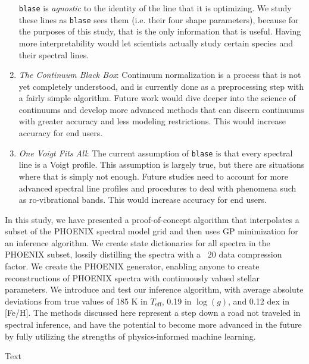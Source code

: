 \documentclass[twocolumn]{aastex631}
\begin{document}
\begin{enumerate}[label=-]
    \texttt{blase} is \textit{agnostic} to the identity of the line that it is optimizing. 
    We study these lines as \texttt{blase} sees them (i.e. their four shape parameters), because for the purposes of this study, that is the only information that is useful.
    Having more interpretability would let scientists actually study certain species and their spectral lines.
    \item \textit{The Continuum Black Box}: Continuum normalization is a process that is not yet completely understood, and is currently done as a preprocessing step with a fairly simple algorithm. 
    Future work would dive deeper into the science of continuums and develop more advanced methods that can discern continuums with greater accuracy and less modeling restrictions.
    This would increase accuracy for end users.
    \item \textit{One Voigt Fits All}: The current assumption of \texttt{blase} is that every spectral line is a Voigt profile. 
    This assumption is largely true, but there are situations where that is simply not enough. 
    Future studies need to account for more advanced spectral line profiles and procedures to deal with phenomena such as ro-vibrational bands.
    This would increase accuracy for end users.
\end{enumerate}
In this study, we have presented a proof-of-concept algorithm that interpolates a subset of the PHOENIX spectral model grid and then uses GP minimization for an inference algorithm.
We create state dictionaries for all spectra in the PHOENIX subset, lossily distilling the spectra with a ~20 data compression factor.
We create the PHOENIX generator, enabling anyone to create reconstructions of PHOENIX spectra with continuously valued stellar parameters.
We introduce and test our inference algorithm, with average absolute deviations from true values of 185 K in $T_\mathrm{eff}$, 0.19 in $\log(g)$, and 0.12 dex in [Fe/H].
The methods discussed here represent a step down a road not traveled in spectral inference, and have the potential to become more advanced in the future by fully utilizing the strengths of physics-informed machine learning.

\begin{acknowledgements}
    Text
\end{acknowledgements}



\end{document}
